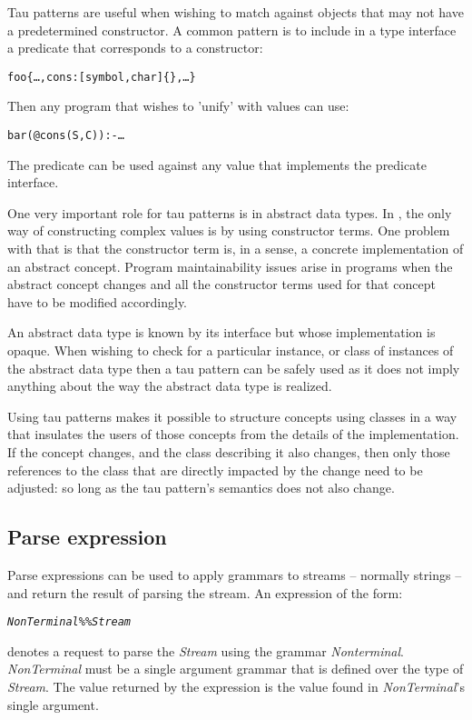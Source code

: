 Tau patterns are useful when wishing to match against objects that may not have a predetermined constructor. A common pattern is to include in a type interface a predicate that corresponds to a constructor:
\begin{alltt}
foo \impl \{ \ldots, cons:[symbol,char]\{\}, \ldots \}
\end{alltt}
Then any program that wishes to 'unify' with  values can use:
\begin{alltt}
bar(@cons(S,C)) :- \ldots
\end{alltt}
The  predicate can be used against any value that implements the  predicate interface.

\begin{aside}
One very important role for tau patterns is in abstract data types. In \prolog, the only way of constructing complex values is by using constructor terms. One problem with that is that the constructor term is, in a sense, a concrete implementation of an abstract concept. Program maintainability issues arise in \prolog programs when the abstract concept changes and all the constructor terms used for that concept have to be modified accordingly.

An abstract data type is known by its interface but whose implementation is opaque. When wishing to check for a particular instance, or class of instances of the abstract data type then a tau pattern can be safely used as it does not imply anything about the way the abstract data type is realized.

Using tau patterns makes it possible to structure concepts using classes in a way that insulates the users of those concepts from the details of the implementation. If the concept changes, and the class describing it also changes, then only those references to the class that are directly impacted by the change need to be adjusted: so long as the tau pattern's semantics does not also change.
\end{aside}

\subsection{Parse expression}
\label{expression:grammarexp}

Parse expressions can be used to apply grammars to streams -- normally strings -- and return the result of parsing the stream. An expression of the form:
\begin{alltt}
\emph{NonTerminal} \%\% \emph{Stream}
\end{alltt}
denotes a request to parse the \emph{Stream} using the grammar \emph{Nonterminal}. \emph{NonTerminal} must be a single argument grammar that is defined over the type of \emph{Stream}. The value returned by the \q{\%\%} expression is the value found in \emph{NonTerminal}'s single argument.

